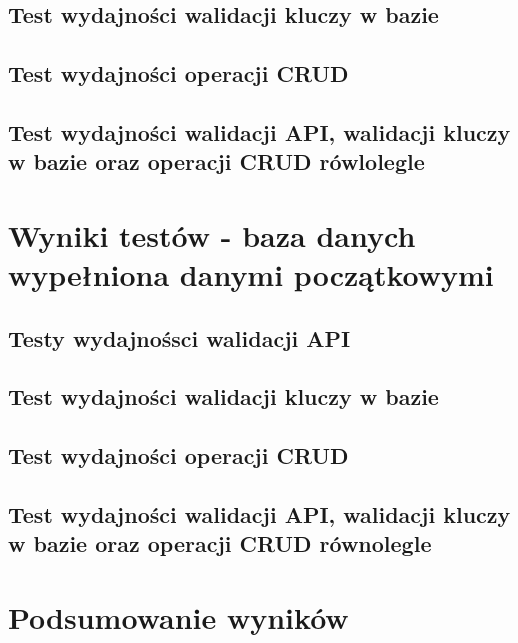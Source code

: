 % 

\clearpage

\subsection{Test wydajności walidacji kluczy w bazie}
% 

\clearpage

\subsection{Test wydajności operacji CRUD}
% 

\clearpage

\subsection{Test wydajności walidacji API, walidacji kluczy w bazie oraz operacji CRUD rówlolegle }
% 

\clearpage

\newpage
\section{Wyniki testów - baza danych wypełniona danymi początkowymi}
\subsection{Testy wydajnośsci walidacji API}
% 

\clearpage

\subsection{Test wydajności walidacji kluczy w bazie}
% 

\clearpage

\subsection{Test wydajności operacji CRUD}
% 

\clearpage

\subsection{Test wydajności walidacji API, walidacji kluczy w bazie oraz operacji CRUD równolegle }
% 

\clearpage

\newpage
\section{Podsumowanie wyników}
